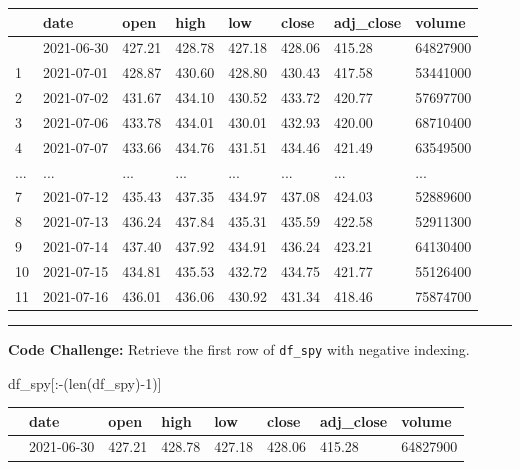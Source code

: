 \documentclass[
  letterpaper,
  DIV=11,
  numbers=noendperiod]{scrreprt}
\newenvironment{Shaded}{\begin{snugshade}}{\end{snugshade}}
\newcommand{\BuiltInTok}[1]{\textcolor[rgb]{0.00,0.23,0.31}{#1}}
\newcommand{\DecValTok}[1]{\textcolor[rgb]{0.68,0.00,0.00}{#1}}
\newcommand{\NormalTok}[1]{\textcolor[rgb]{0.00,0.23,0.31}{#1}}
\newcommand{\OperatorTok}[1]{\textcolor[rgb]{0.37,0.37,0.37}{#1}}
\begin{document}
\begin{longtable}[]{@{}llllllll@{}}
\toprule\noalign{}
& date & open & high & low & close & adj\_close & volume \\
\midrule\noalign{}
\endhead
\bottomrule\noalign{}
\endlastfoot
0 & 2021-06-30 & 427.21 & 428.78 & 427.18 & 428.06 & 415.28 &
64827900 \\
1 & 2021-07-01 & 428.87 & 430.60 & 428.80 & 430.43 & 417.58 &
53441000 \\
2 & 2021-07-02 & 431.67 & 434.10 & 430.52 & 433.72 & 420.77 &
57697700 \\
3 & 2021-07-06 & 433.78 & 434.01 & 430.01 & 432.93 & 420.00 &
68710400 \\
4 & 2021-07-07 & 433.66 & 434.76 & 431.51 & 434.46 & 421.49 &
63549500 \\
... & ... & ... & ... & ... & ... & ... & ... \\
7 & 2021-07-12 & 435.43 & 437.35 & 434.97 & 437.08 & 424.03 &
52889600 \\
8 & 2021-07-13 & 436.24 & 437.84 & 435.31 & 435.59 & 422.58 &
52911300 \\
9 & 2021-07-14 & 437.40 & 437.92 & 434.91 & 436.24 & 423.21 &
64130400 \\
10 & 2021-07-15 & 434.81 & 435.53 & 432.72 & 434.75 & 421.77 &
55126400 \\
11 & 2021-07-16 & 436.01 & 436.06 & 430.92 & 431.34 & 418.46 &
75874700 \\
\end{longtable}

\begin{center}\rule{0.5\linewidth}{0.5pt}\end{center}

\textbf{Code Challenge:} Retrieve the first row of \texttt{df\_spy} with
negative indexing.

\begin{Shaded}
\begin{Highlighting}[]
\NormalTok{df\_spy[:}\OperatorTok{{-}}\NormalTok{(}\BuiltInTok{len}\NormalTok{(df\_spy)}\OperatorTok{{-}}\DecValTok{1}\NormalTok{)]}
\end{Highlighting}
\end{Shaded}

\begin{longtable}[]{@{}llllllll@{}}
\toprule\noalign{}
& date & open & high & low & close & adj\_close & volume \\
\midrule\noalign{}
\endhead
\bottomrule\noalign{}
\endlastfoot
0 & 2021-06-30 & 427.21 & 428.78 & 427.18 & 428.06 & 415.28 &
64827900 \\
\end{longtable}
\end{document}
